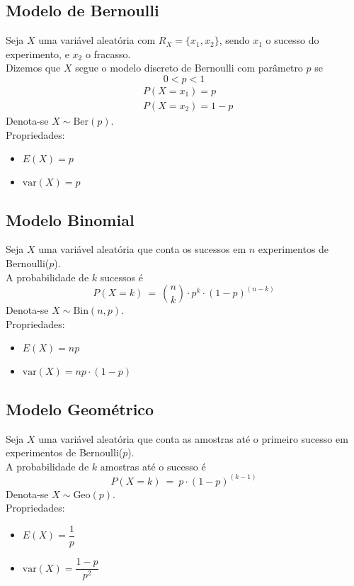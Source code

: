 \documentclass{article}
\begin{document}
\pagebreak


\subsection{Modelo de Bernoulli}
Seja $X$ uma variável aleatória com $R_X = \{ x_1, x_2 \}$, sendo $x_1$ o sucesso do experimento, e $x_2$ o fracasso. \\
Dizemos que $X$ segue o modelo discreto de Bernoulli com parâmetro $p$ se
\[ 0 < p < 1 \]
\vspace{-20pt}
\begin{align*}
  &P(X = x_1) = p \\
  &P(X = x_2) = 1 - p
\end{align*}
Denota-se $X \sim \text{Ber}(p)$. \\[10pt]
Propriedades:
\begin{itemize}
  \item $E(X) = p$
  \item $\text{var}(X) = p$
\end{itemize}


\subsection{Modelo Binomial}
Seja $X$ uma variável aleatória que conta os sucessos em $n$ experimentos de Bernoulli($p$). \\
A probabilidade de $k$ sucessos é
\[ P(X = k) \>=\> {n \choose k} \cdot p^k \cdot {(1 - p)}^{(n - k)} \]
Denota-se $X \sim \text{Bin}(n,p)$. \\[10pt]
Propriedades:
\begin{itemize}
  \item $E(X) = np$
  \item $\text{var}(X) = np \cdot (1 - p)$
\end{itemize}


\subsection{Modelo Geométrico}
Seja $X$ uma variável aleatória que conta as amostras até o primeiro sucesso em experimentos de Bernoulli($p$). \\
A probabilidade de $k$ amostras até o sucesso é
\[ P(X = k) \>=\> p \cdot {(1 - p)}^{(k - 1)} \]
Denota-se $X \sim \text{Geo}(p)$. \\[10pt]
Propriedades:
\begin{itemize}
  \item $E(X) = \dfrac{1}{p}$
  \item $\text{var}(X) = \dfrac{1 - p}{p^2}$
\end{itemize}
\end{document}
